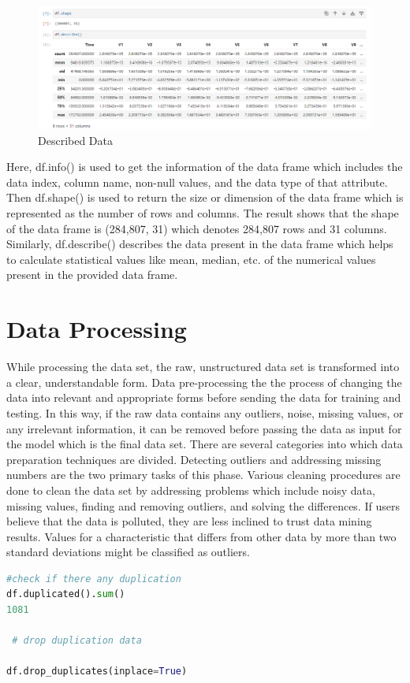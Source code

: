 \begin{figure}[ht]
    \centering
    \includegraphics[scale=1]{figures/Data Analysis.png}
    \caption{Described Data}
    \label{fig:Data Preprocessing}
\end{figure}
\clearpage
Here, df.info() is used to get the information of the data frame which includes the data index, column name, non-null values, and the data type of that attribute. Then df.shape() is used to return the size or dimension of the data frame which is represented as the number of rows and columns. The result shows that the shape of the data frame is (284,807, 31) which denotes 284,807 rows and 31 columns. Similarly, df.describe() describes the data present in the data frame which helps to calculate statistical values like mean, median, etc. of the numerical values present in the provided data frame.


\section{Data Processing}
While processing the data set, the raw, unstructured data set is transformed into a clear, understandable form. Data pre-processing the the process of changing the data into relevant and appropriate forms before sending the data for training and testing. In this way, if the raw data contains any outliers, noise, missing values, or any irrelevant information, it can be removed before passing the data as input for the model which is the final data set. There are several  categories into which data preparation techniques are divided. Detecting outliers and addressing missing numbers are the two primary tasks of this phase. Various cleaning procedures are done to clean the data set by addressing problems which include noisy data, missing values, finding and removing outliers, and solving the differences. If users believe that the data is polluted, they are less inclined to trust data mining results. Values for a characteristic that differs from other data by more than two standard deviations might be classified as outliers. 
\begin{lstlisting}[language=Python, caption={Data Processing}, label=list:python_code_ex]
#check if there any duplication
df.duplicated().sum()
1081

 # drop duplication data

df.drop_duplicates(inplace=True)
\end{lstlisting}

